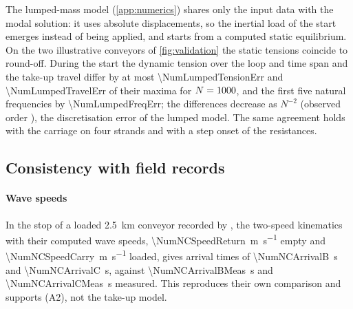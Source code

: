 The lumped-mass model (\cref{app:numerics}) shares only the input data with the modal
solution: it uses absolute displacements, so the inertial load of the start emerges instead of
being applied, and starts from a computed static equilibrium. On the two illustrative conveyors
of \cref{fig:validation} the static tensions coincide to round-off. During the
start the dynamic tension over the loop and time span and the take-up travel differ by at most
\num{\NumLumpedTensionErr} and \num{\NumLumpedTravelErr} of their maxima for
$N=1000$, and the first five natural frequencies by \num{\NumLumpedFreqErr}; the
differences decrease as $N^{-2}$ (observed order \NumLumpedOrder), the discretisation error of
the lumped model. The same agreement holds with the carriage on four strands and with a step
onset of the resistances.

\subsection{Consistency with field records}\label{sec:fieldchecks}

\paragraph{Wave speeds} In the stop of a loaded \qty{2.5}{\kilo\metre} conveyor recorded by
\citet{nordell1984}, the two-speed kinematics with their computed wave speeds,
\qty{\NumNCSpeedReturn}{\metre\per\second} empty and \qty{\NumNCSpeedCarry}{\metre\per\second}
loaded, gives arrival times of \qty{\NumNCArrivalB}{\second} and \qty{\NumNCArrivalC}{\second},
against \qty{\NumNCArrivalBMeas}{\second} and \qty{\NumNCArrivalCMeas}{\second} measured. This
reproduces their own comparison and supports (A2), not the take-up model.

